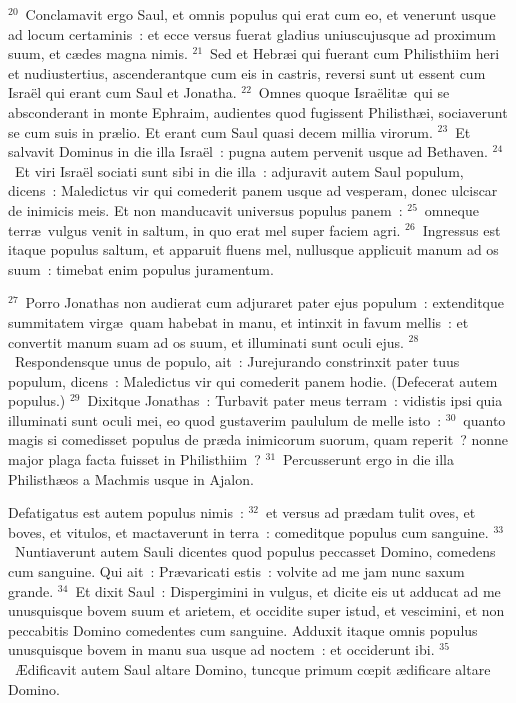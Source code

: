 ${}^{20}$~Conclamavit ergo Saul, et omnis populus qui erat cum eo, et venerunt usque ad locum certaminis~: et ecce versus fuerat gladius uniuscujusque ad proximum suum, et c\ae des magna nimis.
${}^{21}$~Sed et Hebr\ae i qui fuerant cum Philisthiim heri et nudiustertius, ascenderantque cum eis in castris, reversi sunt ut essent cum Isra\"el qui erant cum Saul et Jonatha.
${}^{22}$~Omnes quoque Isra\"elit\ae\ qui se absconderant in monte Ephraim, audientes quod fugissent Philisth\ae i, sociaverunt se cum suis in pr\ae lio. Et erant cum Saul quasi decem millia virorum.
${}^{23}$~Et salvavit Dominus in die illa Isra\"el~: pugna autem pervenit usque ad Bethaven.
${}^{24}$~Et viri Isra\"el sociati sunt sibi in die illa~: adjuravit autem Saul populum, dicens~: Maledictus vir qui comederit panem usque ad vesperam, donec ulciscar de inimicis meis. Et non manducavit universus populus panem~:
${}^{25}$~omneque terr\ae\ vulgus venit in saltum, in quo erat mel super faciem agri.
${}^{26}$~Ingressus est itaque populus saltum, et apparuit fluens mel, nullusque applicuit manum ad os suum~: timebat enim populus juramentum.


${}^{27}$~Porro Jonathas non audierat cum adjuraret pater ejus populum~: extenditque summitatem virg\ae\ quam habebat in manu, et intinxit in favum mellis~: et convertit manum suam ad os suum, et illuminati sunt oculi ejus.
${}^{28}$~Respondensque unus de populo, ait~: Jurejurando constrinxit pater tuus populum, dicens~: Maledictus vir qui comederit panem hodie. (Defecerat autem populus.)
${}^{29}$~Dixitque Jonathas~: Turbavit pater meus terram~: vidistis ipsi quia illuminati sunt oculi mei, eo quod gustaverim paululum de melle isto~:
${}^{30}$~quanto magis si comedisset populus de pr\ae da inimicorum suorum, quam reperit~? nonne major plaga facta fuisset in Philisthiim~?
${}^{31}$~Percusserunt ergo in die illa Philisth\ae os a Machmis usque in Ajalon.

 Defatigatus est autem populus nimis~:
${}^{32}$~et versus ad pr\ae dam tulit oves, et boves, et vitulos, et mactaverunt in terra~: comeditque populus cum sanguine.
${}^{33}$~Nuntiaverunt autem Sauli dicentes quod populus peccasset Domino, comedens cum sanguine. Qui ait~: Pr\ae varicati estis~: volvite ad me jam nunc saxum grande.
${}^{34}$~Et dixit Saul~: Dispergimini in vulgus, et dicite eis ut adducat ad me unusquisque bovem suum et arietem, et occidite super istud, et vescimini, et non peccabitis Domino comedentes cum sanguine. Adduxit itaque omnis populus unusquisque bovem in manu sua usque ad noctem~: et occiderunt ibi.
${}^{35}$~\AE dificavit autem Saul altare Domino, tuncque primum cœpit \ae dificare altare Domino.


